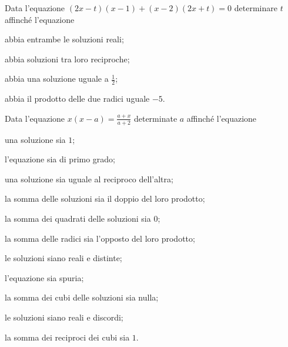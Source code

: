 \begin{esercizio}[\Ast] %
 \label{ese:3.113}
Data l'equazione $(2x-t)(x-1)+(x-2)(2x+t)=0$ determinare $t$ affinché l'equazione
\begin{enumeratea}
\item abbia entrambe le soluzioni reali;
\item abbia soluzioni tra loro reciproche;
\item abbia una soluzione uguale a $\frac{1}{2}$;
\item abbia il prodotto delle due radici uguale $-5$.
\end{enumeratea}
\end{esercizio}
\pagebreak
\begin{esercizio}[\Ast]
 \label{ese:3.114}
Data l'equazione $x (x-a) = \frac{a + x}{a + 2}$ determinate $a$ affinché l'equazione
\begin{enumeratea}
\item una soluzione sia $1$;
\item l'equazione sia di primo grado;
\item una soluzione sia uguale al reciproco dell'altra;
\item la somma delle soluzioni sia il doppio del loro prodotto;
\item la somma dei quadrati delle soluzioni sia $0$;
\item la somma delle radici sia l'opposto del loro prodotto;
\item le soluzioni siano reali e distinte;
\item l'equazione sia spuria;
\item la somma dei cubi delle soluzioni sia nulla;
\item le soluzioni siano reali e discordi;
\item la somma dei reciproci dei cubi sia $1$.
\end{enumeratea}
\end{esercizio}

